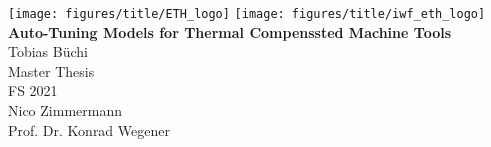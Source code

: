 \documentclass[paper=a4,twoside=true,fontsize=11pt,numbers=noendperiod,chapterprefix=false]{scrbook}
\begin{document}
%


\newcommand{\mykeyword}[0]{my long text}
\newcommand{\chpref}[1]{Chapter \ref{#1}}
\newcommand{\secref}[1]{Section \ref{#1}}
\newcommand{\figref}[1]{Figure \ref{#1}}
\newcommand{\tabref}[1]{Table \ref{#1}}
\newcommand{\apxref}[1]{Appendix \ref{#1}}

\setcounter{page}{-1}  %
\begin{titlepage}
	\topmargin -3.8cm
	\oddsidemargin 0.0cm
	\evensidemargin 0.0cm
	\centering
	\texttt{[image: figures/title/ETH\_logo]} \hfill
	\texttt{[image: figures/title/iwf\_eth\_logo]} \\
	\vspace{7.2cm} %
	\Huge
	\textbf{\textsf{Auto-Tuning Models for Thermal Compenssted Machine Tools}} \\[2.0cm]
	\vspace{4.0cm} %
	\sffamily
	\Large
	Tobias Büchi
	\\[0.8cm]
	\large
	Master Thesis
	\\
	FS 2021
	\\[0.8cm] %
	Nico Zimmermann 
	\\[0.5cm]
	Prof. Dr. Konrad Wegener
	\vfill
\end{titlepage}
\clearemptydoublepage
\end{document}
